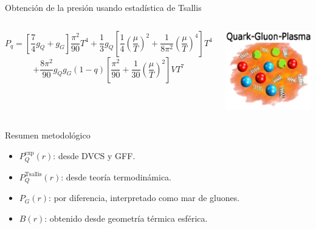\documentclass{beamer}
\begin{document}
\begin{frame}{Obtención de la presión usando estadística de Tsallis}
\begin{columns}
{\begin{itemize}
        \[
          P_q = \left[ \frac{7}{4} g_Q + g_G \right] \frac{\pi^2}{90} T^4 + 
          \frac{1}{3} g_Q \left[ \frac{1}{4} \left( \frac{\mu}{T} \right)^2 +
          \frac{1}{8\pi^2} \left( \frac{\mu}{T} \right)^4 \right] T^4
        \]
        \[
          + \frac{8\pi^2}{90} g_Q g_G (1 - q) \left[ \frac{\pi^2}{90} +
          \frac{1}{30} \left( \frac{\mu}{T} \right)^2 \right] VT^7
        \]
      \end{itemize}
    }

    \centering
    \vspace{2cm}
    \includegraphics[width=0.9\linewidth]{figures/QG-plasma.png} %
  \end{columns}
\end{frame}



\begin{frame}{Resumen metodológico}
  \begin{itemize}
    \item \( P_Q^{\text{exp}}(r) \): desde DVCS y GFF.
    \item \( P_Q^{\text{Tsallis}}(r) \): desde teoría termodinámica.
    \item \( P_G(r) \): por diferencia, interpretado como mar de gluones.
    \item \( B(r) \): obtenido desde geometría térmica esférica.
  \end{itemize}
\end{frame}
\end{document}
